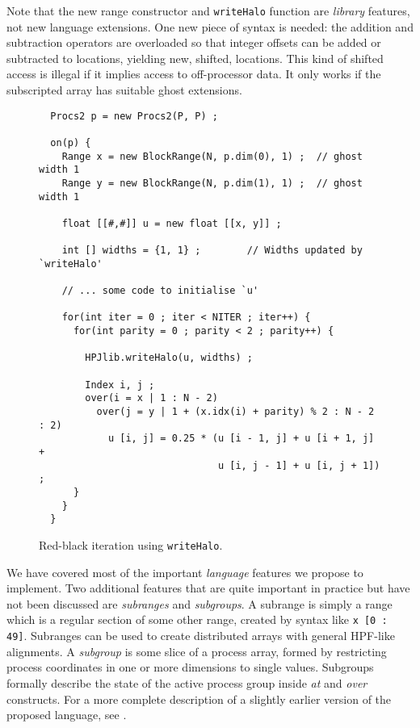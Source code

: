 Note that the new range constructor and {\tt writeHalo} function are {\em
library} features, not new language extensions.  One new piece of
syntax is needed:  the addition and subtraction operators are
overloaded so that integer offsets can be added or subtracted to
locations, yielding new, shifted, locations.  This kind of shifted
access is illegal if it implies access to off-processor data.  It only
works if the subscripted array has suitable ghost extensions.

\begin{figure}[btp]
\small
\begin{verbatim}
  Procs2 p = new Procs2(P, P) ;

  on(p) {
    Range x = new BlockRange(N, p.dim(0), 1) ;  // ghost width 1
    Range y = new BlockRange(N, p.dim(1), 1) ;  // ghost width 1

    float [[#,#]] u = new float [[x, y]] ;

    int [] widths = {1, 1} ;        // Widths updated by `writeHalo'

    // ... some code to initialise `u'

    for(int iter = 0 ; iter < NITER ; iter++) {
      for(int parity = 0 ; parity < 2 ; parity++) {

        HPJlib.writeHalo(u, widths) ;

        Index i, j ;
        over(i = x | 1 : N - 2)
          over(j = y | 1 + (x.idx(i) + parity) % 2 : N - 2 : 2)
            u [i, j] = 0.25 * (u [i - 1, j] + u [i + 1, j] +
                               u [i, j - 1] + u [i, j + 1]) ;
      }
    }
  }
\end{verbatim}
\normalsize
\caption{\label{RedBlack}Red-black iteration using {\tt writeHalo}.}
\end{figure}

%
We have covered most of the important {\em language} features
we propose to implement.  Two additional features that are quite important in
practice but have not been discussed are {\em subranges} and {\em
subgroups}.  A subrange is simply a range which is a regular section of
some other range, created by syntax like \verb$x [0 : 49]$.
Subranges can be used to create distributed
arrays with general HPF-like alignments.  
A {\em subgroup} is some
slice of a process array, formed by restricting process coordinates in
one or more dimensions to single values.
Subgroups formally describe the state of the active process group
inside {\em at} and {\em over} constructs.
For a more complete description of a slightly earlier version of
the proposed language, see \cite{JavaAd}.


